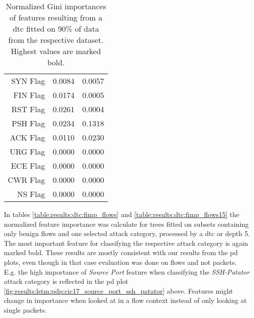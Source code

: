 \begin{table}[]
\begin{tabular}{r|c|c}
		SYN Flag          & 0.0084                                                                   & 0.0057                                                                \\
		FIN Flag          & 0.0174                                                                   & 0.0005                                                                \\
		RST Flag          & 0.0261                                                                   & 0.0004                                                                \\
		PSH Flag          & 0.0234                                                                   & 0.1318                                                                \\
		ACK Flag          & 0.0110                                                                   & 0.0230                                                                \\
		URG Flag          & 0.0000                                                                   & 0.0000                                                                \\
		ECE Flag          & 0.0000                                                                   & 0.0000                                                                \\
		CWR Flag          & 0.0000                                                                   & 0.0000                                                                \\
		NS Flag           & 0.0000                                                                   & 0.0000                                                               
	\end{tabular}
	\caption{Normalized Gini importances of features resulting from a \gls{dtc} fitted on 90\% of data from the respective dataset. Highest values are marked bold.}
	\label{table:results:expl:fimp_90_ds}
\end{table}





In tables \ref{table:results:dtc:fimp_flows} and \ref{table:results:dtc:fimp_flows15} the normalized feature importance was calculate for trees fitted on subsets containing only benign flows and one selected attack category, processed by a \gls{dtc} or depth 5. The most important feature for classifying the respective attack category is again marked bold. These results are mostly consistent with our results from the \gls{pd} plots, even though in that case evaluation was done on flows and not packets. E.g. the high importance of \textit{Source Port} feature when classifying the \textit{SSH-Patator} attack category is reflected in the \gls{pd} plot  \ref{fig:results:lstm:pdp:cic17_source_port_ssh_patator} above. Features might change in importance when looked at in a flow context instead of only looking at single packets.

\newpage
